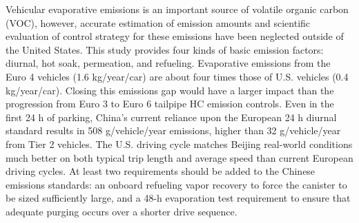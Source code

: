 Vehicular evaporative emissions is an important source of volatile organic carbon (VOC), however, accurate estimation of emission amounts and scientific evaluation of control strategy for these emissions have been neglected outside of the United States. This study provides four kinds of basic emission factors: diurnal, hot soak, permeation, and refueling. Evaporative emissions from the Euro 4 vehicles (1.6 kg/year/car) are about four times those of U.S. vehicles (0.4 kg/year/car). Closing this emissions gap would have a larger impact than the progression from Euro 3 to Euro 6 tailpipe HC emission controls. Even in the first 24 h of parking, China’s current reliance upon the European 24 h diurnal standard results in 508 g/vehicle/year emissions, higher than 32 g/vehicle/year from Tier 2 vehicles. The U.S. driving cycle matches Beijing real-world conditions much better on both typical trip length and average speed than current European driving cycles. At least two requirements should be added to the Chinese emissions standards: an onboard refueling vapor recovery to force the canister to be sized sufficiently large, and a 48-h evaporation test requirement to ensure that adequate purging occurs over a shorter drive sequence.
